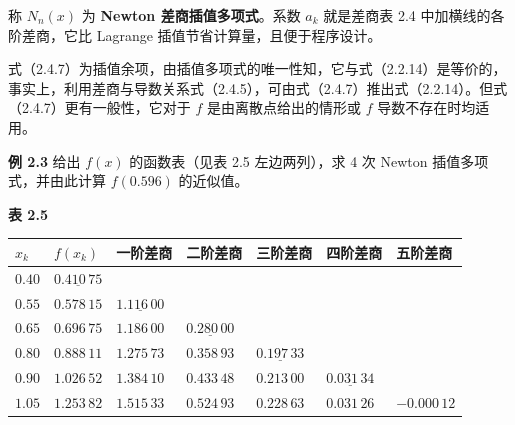 \documentclass[
  10pt,
  fontset=fandol]{ctexart}
\newcounter{none} %
\begin{document}
称 \(N_n(x)\) 为 \textbf{Newton 差商插值多项式}。系数 \(a_k\) 就是差商表 2.4 中加横线的各阶差商，它比 Lagrange 插值节省计算量，且便于程序设计。

式（2.4.7）为插值余项，由插值多项式的唯一性知，它与式（2.2.14）是等价的，事实上，利用差商与导数关系式（2.4.5），可由式（2.4.7）推出式（2.2.14）。但式（2.4.7）更有一般性，它对于 \(f\) 是由离散点给出的情形或 \(f\) 导数不存在时均适用。

\textbf{例 2.3} 给出 \(f(x)\) 的函数表（见表 2.5 左边两列），求 4 次 Newton 插值多项式，并由此计算 \(f(0.596)\) 的近似值。

\textbf{表 2.5}

{\def\LTcaptype{none} %
\begin{longtable}[]{@{}
  >{\raggedright\arraybackslash}p{}
  >{\raggedright\arraybackslash}p{}
  >{\raggedright\arraybackslash}p{}
  >{\raggedright\arraybackslash}p{}
  >{\raggedright\arraybackslash}p{}
  >{\raggedright\arraybackslash}p{}
  >{\raggedright\arraybackslash}p{}@{}}
\toprule\noalign{}
\begin{minipage}[b]{\linewidth}\raggedright
\(x_k\)
\end{minipage} & \begin{minipage}[b]{\linewidth}\raggedright
\(f(x_k)\)
\end{minipage} & \begin{minipage}[b]{\linewidth}\raggedright
一阶差商
\end{minipage} & \begin{minipage}[b]{\linewidth}\raggedright
二阶差商
\end{minipage} & \begin{minipage}[b]{\linewidth}\raggedright
三阶差商
\end{minipage} & \begin{minipage}[b]{\linewidth}\raggedright
四阶差商
\end{minipage} & \begin{minipage}[b]{\linewidth}\raggedright
五阶差商
\end{minipage} \\
\midrule\noalign{}
\endhead
\bottomrule\noalign{}
\endlastfoot
\(0.40\) & \(\underline{0.410\,75}\) & & & & & \\
\(0.55\) & \(0.578\,15\) & \(\underline{1.116\,00}\) & & & & \\
\(0.65\) & \(0.696\,75\) & \(1.186\,00\) & \(\underline{0.280\,00}\) & & & \\
\(0.80\) & \(0.888\,11\) & \(1.275\,73\) & \(0.358\,93\) & \(\underline{0.197\,33}\) & & \\
\(0.90\) & \(1.026\,52\) & \(1.384\,10\) & \(0.433\,48\) & \(0.213\,00\) & \(\underline{0.031\,34}\) & \\
\(1.05\) & \(1.253\,82\) & \(1.515\,33\) & \(0.524\,93\) & \(0.228\,63\) & \(0.031\,26\) & \(-0.000\,12\) \\
\end{longtable}
}
\end{document}
